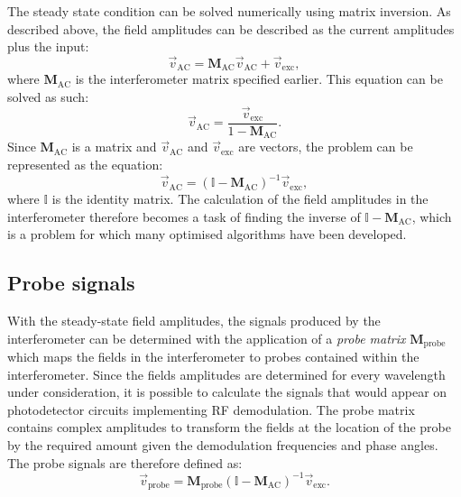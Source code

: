 The steady state condition can be solved numerically using matrix inversion. As described above, the field amplitudes can be described as the current amplitudes plus the input:
\begin{equation}
  \vec{v}_{\text{AC}} = \mathbf{M}_{\text{AC}} \vec{v}_{\text{AC}} + \vec{v}_{\text{exc}},
\end{equation}
where $\mathbf{M}_{\text{AC}}$ is the interferometer matrix specified earlier. This equation can be solved as such:
\begin{equation}
  \vec{v}_{\text{AC}} = \frac{\vec{v}_{\text{exc}}}{1 - \mathbf{M}_{\text{AC}}}.
\end{equation}
Since $\mathbf{M}_{\text{AC}}$ is a matrix and $\vec{v}_{\text{AC}}$ and $\vec{v}_{\text{exc}}$ are vectors, the problem can be represented as the equation:
\begin{equation}
  \vec{v}_{\text{AC}} = \left( \mathbb{I} - \mathbf{M}_{\text{AC}} \right)^{-1} \vec{v}_{\text{exc}},
\end{equation}
where $\mathbb{I}$ is the identity matrix. The calculation of the field amplitudes in the interferometer therefore becomes a task of finding the inverse of $\mathbb{I} - \mathbf{M}_{\text{AC}}$, which is a problem for which many optimised algorithms have been developed.

\subsection{Probe signals}
With the steady-state field amplitudes, the signals produced by the interferometer can be determined with the application of a \emph{probe matrix} $\mathbf{M}_{\text{probe}}$ which maps the fields in the interferometer to probes contained within the interferometer. Since the fields amplitudes are determined for every wavelength under consideration, it is possible to calculate the signals that would appear on photodetector circuits implementing \gls{RF} demodulation. The probe matrix contains complex amplitudes to transform the fields at the location of the probe by the required amount given the demodulation frequencies and phase angles. The probe signals are therefore defined as:
\begin{equation}
  \vec{v}_{\text{probe}} = \mathbf{M}_{\text{probe}} \left( \mathbb{I} - \mathbf{M}_{\text{AC}} \right)^{-1} \vec{v}_{\text{exc}}.
\end{equation}

